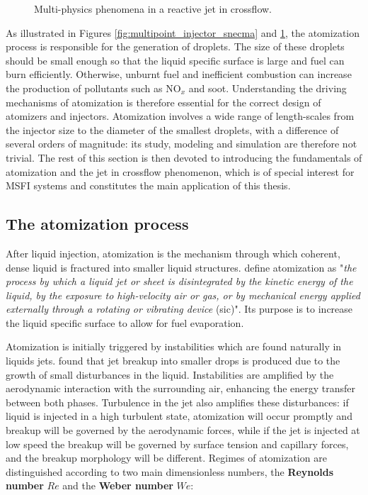 \begin{figure}[ht]
     \centering
      \caption{Multi-physics phenomena in a reactive jet in crossflow. }
      \label{fig:JICF_multiphysics}
\end{figure}

As illustrated in Figures \ref{fig:multipoint_injector_snecma} and \ref{fig:JICF_multiphysics}, the atomization process is responsible for the generation of droplets. The size of these droplets should be small enough so that the liquid specific surface is large and fuel can burn efficiently. Otherwise, unburnt fuel and inefficient combustion can increase the production of pollutants such as NO$_x$ and soot. Understanding the driving mechanisms of atomization is therefore essential for the correct design of atomizers and injectors. Atomization involves a wide range of length-scales from the injector size to the diameter of the smallest droplets, with a difference of several orders of magnitude: its study, modeling and simulation are therefore not trivial. The rest of this section is then devoted to introducing the fundamentals of atomization and the jet in crossflow phenomenon, which is of special interest for MSFI systems and constitutes the main application of this thesis.

\subsection*{The atomization process}

After liquid injection, atomization is the mechanism through which coherent, dense liquid is fractured into smaller liquid structures.  define atomization as "\textsl{the process by which a liquid jet or sheet is disintegrated by the kinetic energy of the liquid, by the exposure to
high-velocity air or gas, or by mechanical energy applied externally through a rotating or vibrating device} (sic)". Its purpose is to increase the liquid specific surface to allow for fuel evaporation.

Atomization is initially triggered by instabilities which are found naturally in liquids jets.  found that jet breakup into smaller drops is produced due to the growth of small disturbances in the liquid. Instabilities are amplified by the aerodynamic interaction with the surrounding air, enhancing the energy transfer between both phases. Turbulence in the jet also amplifies these disturbances: if liquid is injected in a high turbulent state, atomization will occur promptly and breakup will be governed by the aerodynamic forces, while if the jet is injected at low speed the breakup will be governed by surface tension and capillary forces, and the breakup morphology will be different. Regimes of atomization are distinguished according to two main dimensionless numbers, the \textbf{Reynolds number} $Re$ and the \textbf{Weber number} $We$:

